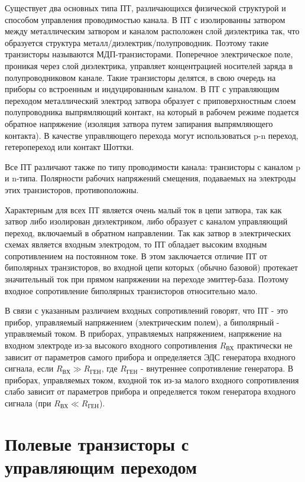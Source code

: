 Существует два основных типа ПТ, различающихся физической структурой и способом управления проводимостью канала. В ПТ с изолированны затвором между металлическим затвором и каналом расположен слой диэлектрика так, что образуется структура металл/диэлектрик/полупроводник. Поэтому такие транзисторы называются МДП-транзисторами. Поперечное электрическое поле, проникая через слой диэлектрика, управляет концентрацией носителей заряда в полупроводниковом канале. Такие транзисторы делятся, в свою очередь на приборы со встроенным и индуцированным каналом. В ПТ с управляющим переходом металлический электрод затвора образует с приповерхностным слоем полупроводника выпрямляющий контакт, на который в рабочем режиме подается обратное напряжение (изоляция затвора путем запирания выпрямляющего контакта). В качестве управляющего перехода могут использоваться p-n переход, гетеропереход или контакт Шоттки.

Все ПТ различают также по типу проводимости канала: транзисторы с каналом p и n-типа. Полярности рабочих напряжений смещения, подаваемых на электроды этих транзисторов, противоположны.

Характерным для всех ПТ является очень малый ток в цепи затвора, так как затвор либо изолирован диэлектриком, либо образует с каналом управляющий переход, включаемый в обратном направлении. Так как затвор в электрических схемах является входным электродом, то ПТ обладает высоким входным сопротивлением на постоянном токе. В этом заключается отличие ПТ от биполярных транзисторов, во входной цепи которых (обычно базовой) протекает значительный ток при прямом напряжении на переходе эмиттер-база. Поэтому входное сопротивление биполярных транзисторов относительно мало. 

В связи с указанным различием входных сопротивлений говорят, что ПТ - это прибор, управляемый напряжением (электрическим полем), а биполярный - управляемый током. В приборах, управляемых напряжением, напряжение на входном электроде из-за высокого входного сопротивления $R_\text{ВХ}$ практически не зависит от параметров самого прибора и определяется ЭДС генератора входного сигнала, если $R_\text{ВХ} \gg R_\text{ГЕН}$, где $R_\text{ГЕН}$ - внутреннее сопротивление генератора. В приборах, управляемых током, входной ток из-за малого входного сопротивления слабо зависит от параметров прибора и определяется током генератора входного сигнала (при $R_\text{ВХ} \ll R_\text{ГЕН}$).

\section{Полевые транзисторы с управляющим переходом}

